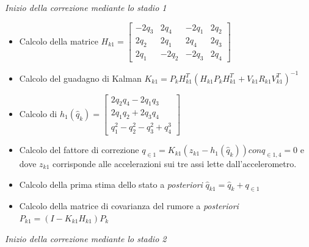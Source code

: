 \textit{Inizio della correzione mediante lo stadio 1}
\begin{itemize}
\item Calcolo della matrice $H_{k1} = \begin{bmatrix}
-2q_3 & 2q_4 & -2q_1 & 2q_2  \\
2q_2 & 2q_1 & 2q_4 & 2q_3\\
2q_1 & -2q_2 & -2q_3 & 2q_4
\end{bmatrix}$
\item Calcolo del guadagno di Kalman $K_{k1} = P_k H_{k1}^T ( H_{k1} P_k H_{k1}^T + V_{k1}R_{k1}V_{k1}^T)^{-1}$
\item Calcolo di $h_1(\hat{q}_k) = \begin{bmatrix}
2q_2q_4 - 2q_1q_3  \\
2q_1q_2 + 2q_3q_4 \\
q_1^2 - q_2^2 - q_3^2 + q_4^3
\end{bmatrix} $
\item Calcolo del fattore di correzione  $q_{\in 1} = K_{k1}(z_{k1}-h_1(\hat{q}_k)) con q_{\in1,4} =0$ e dove $z_{k1}$ corrisponde alle accelerazioni sui tre assi lette dall'accelerometro.
\item Calcolo della prima stima dello stato a \textit{posteriori}  $\hat{q}_{k1}= \hat{q}_k + q_{\in1}$
\item Calcolo della matrice di covarianza del rumore a \textit{posteriori} $P_{k1} = ( I - K_{k1}H_{k1})P_k$
\end{itemize}
\textit{Inizio della correzione mediante lo stadio 2}































